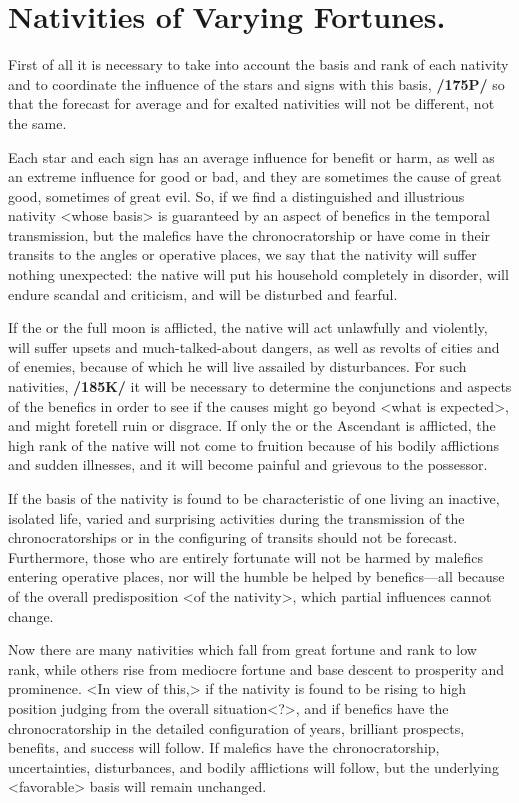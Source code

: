 \section{Nativities of Varying Fortunes.}

First of all it is necessary to take into account the basis and rank of each nativity and to coordinate the influence of the stars and signs with this basis, \textbf{/175P/} so that the forecast for average and for exalted nativities will not be different, not the same. 

Each star and each sign has an average influence for benefit or harm, as well as an extreme influence for good or bad, and they are sometimes the cause of great good, sometimes of great evil. So, if we find a distinguished and illustrious nativity <whose basis> is guaranteed by an aspect of benefics in the temporal transmission, but the malefics have the chronocratorship or have come in their transits to the angles or operative places, we say that the nativity will suffer nothing unexpected: the native will put his household completely in disorder, will endure scandal and criticism, and will be disturbed and fearful. 

If the \Sun\xspace or the full moon is afflicted, the native will act unlawfully and violently, will suffer upsets and much-talked-about dangers, as well as revolts of cities and of enemies, because of which he will live assailed by disturbances. For such nativities, \textbf{/185K/} it will be necessary to determine the conjunctions and aspects of the benefics in order to see if the causes might go beyond <what is expected>, and might foretell ruin or disgrace. If only the \Moon\xspace or the Ascendant is afflicted, the high rank of the native will not come to fruition because of his bodily afflictions and sudden illnesses, and it will become painful and grievous to the possessor.

If the basis of the nativity is found to be characteristic of one living an inactive, isolated life, varied and surprising activities during the transmission of the chronocratorships or in the configuring of transits should not be forecast. Furthermore, those who are entirely fortunate will not be harmed by malefics entering operative places, nor will the humble be helped by benefics—all because of the overall predisposition <of the nativity>, which partial influences cannot change. 

Now there are many nativities which fall from great fortune and rank to low rank, while others rise from mediocre fortune and base descent to prosperity and prominence. <In view of this,> if the nativity is found to be rising to high position judging from the overall situation<?>, and if benefics have the chronocratorship in the detailed configuration of years, brilliant prospects, benefits, and success will follow. If malefics have the chronocratorship, uncertainties, disturbances, and bodily afflictions will follow, but the underlying <favorable> basis will remain unchanged. 


